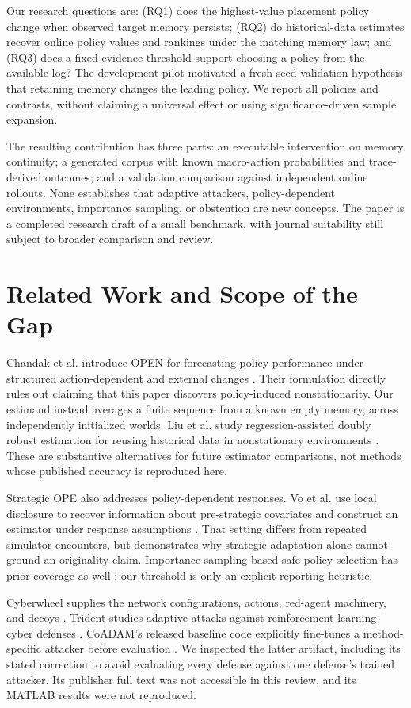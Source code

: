 \documentclass[sigconf,nonacm]{acmart}
\begin{document}
Our research questions are: (RQ1) does the highest-value placement policy change when observed target memory persists; (RQ2) do historical-data estimates recover online policy values and rankings under the matching memory law; and (RQ3) does a fixed evidence threshold support choosing a policy from the available log? The development pilot motivated a fresh-seed validation hypothesis that retaining memory changes the leading policy. We report all policies and contrasts, without claiming a universal effect or using significance-driven sample expansion.

The resulting contribution has three parts: an executable intervention on memory continuity; a generated corpus with known macro-action probabilities and trace-derived outcomes; and a validation comparison against independent online rollouts. None establishes that adaptive attackers, policy-dependent environments, importance sampling, or abstention are new concepts. The paper is a completed research draft of a small benchmark, with journal suitability still subject to broader comparison and review.

\section{Related Work and Scope of the Gap}
Chandak et al. introduce OPEN for forecasting policy performance under structured action-dependent and external changes \cite{open}. Their formulation directly rules out claiming that this paper discovers policy-induced nonstationarity. Our estimand instead averages a finite sequence from a known empty memory, across independently initialized worlds. Liu et al. study regression-assisted doubly robust estimation for reusing historical data in nonstationary environments \cite{liu}. These are substantive alternatives for future estimator comparisons, not methods whose published accuracy is reproduced here.

Strategic OPE also addresses policy-dependent responses. Vo et al. use local disclosure to recover information about pre-strategic covariates and construct an estimator under response assumptions \cite{vo}. That setting differs from repeated simulator encounters, but demonstrates why strategic adaptation alone cannot ground an originality claim. Importance-sampling-based safe policy selection has prior coverage as well \cite{safe}; our threshold is only an explicit reporting heuristic.

Cyberwheel supplies the network configurations, actions, red-agent machinery, and decoys \cite{cyberwheel}. Trident studies adaptive attacks against reinforcement-learning cyber defenses \cite{trident}. CoADAM's released baseline code explicitly fine-tunes a method-specific attacker before evaluation \cite{coadam}. We inspected the latter artifact, including its stated correction to avoid evaluating every defense against one defense's trained attacker. Its publisher full text was not accessible in this review, and its MATLAB results were not reproduced.
\end{document}

